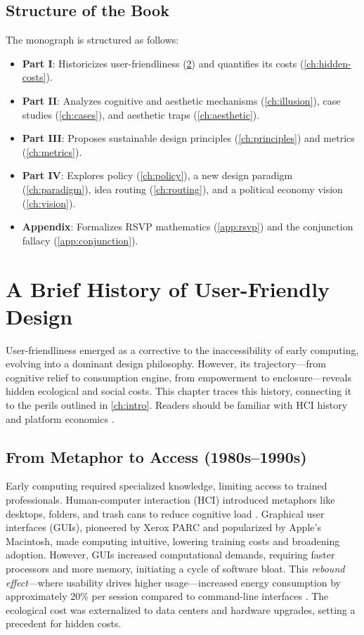 \documentclass[openany]{book}
\begin{document}
\section{Structure of the Book}
\label{sec:intro-structure}
The monograph is structured as follows:
\begin{itemize}
  \item \textbf{Part I}: Historicizes user-friendliness (\cref{ch:history}) and quantifies its costs (\cref{ch:hidden-costs}).
  \item \textbf{Part II}: Analyzes cognitive and aesthetic mechanisms (\cref{ch:illusion}), case studies (\cref{ch:cases}), and aesthetic traps (\cref{ch:aesthetic}).
  \item \textbf{Part III}: Proposes sustainable design principles (\cref{ch:principles}) and metrics (\cref{ch:metrics}).
  \item \textbf{Part IV}: Explores policy (\cref{ch:policy}), a new design paradigm (\cref{ch:paradigm}), idea routing (\cref{ch:routing}), and a political economy vision (\cref{ch:vision}).
  \item \textbf{Appendix}: Formalizes RSVP mathematics (\cref{app:rsvp}) and the conjunction fallacy (\cref{app:conjunction}).
\end{itemize}

\chapter{A Brief History of User-Friendly Design}
\label{ch:history}

User-friendliness emerged as a corrective to the inaccessibility of early computing, evolving into a dominant design philosophy. However, its trajectory---from cognitive relief to consumption engine, from empowerment to enclosure---reveals hidden ecological and social costs. This chapter traces this history, connecting it to the perils outlined in \cref{ch:intro}. Readers should be familiar with HCI history and platform economics \citep{norman1988,doctorow2022}.

\section{From Metaphor to Access (1980s--1990s)}
\label{sec:history-metaphor}
Early computing required specialized knowledge, limiting access to trained professionals. Human-computer interaction (HCI) introduced metaphors like desktops, folders, and trash cans to reduce cognitive load \citep{norman1988}. Graphical user interfaces (GUIs), pioneered by Xerox PARC and popularized by Apple’s Macintosh, made computing intuitive, lowering training costs and broadening adoption. However, GUIs increased computational demands, requiring faster processors and more memory, initiating a cycle of software bloat. This \emph{rebound effect}---where usability drives higher usage---increased energy consumption by approximately 20\% per session compared to command-line interfaces \citep{extentia2024}. The ecological cost was externalized to data centers and hardware upgrades, setting a precedent for hidden costs.
\end{document}
